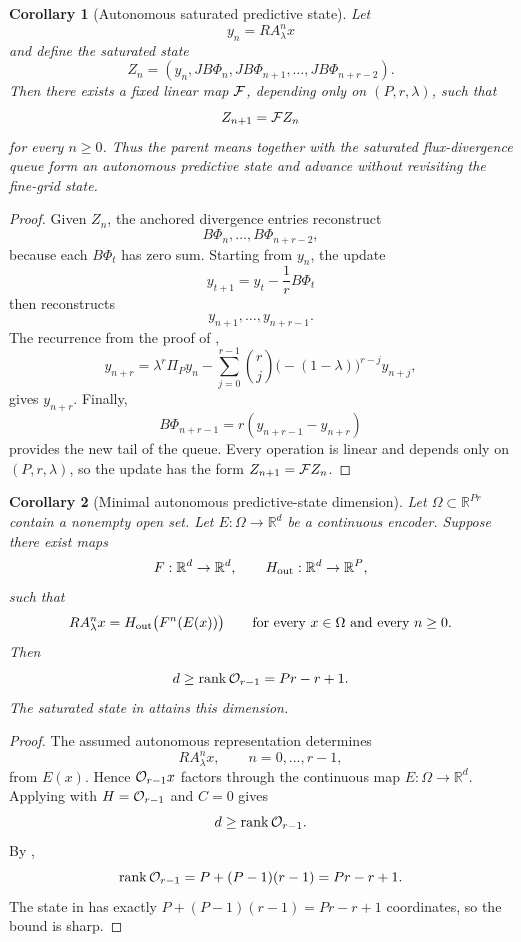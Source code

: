 \documentclass[preprint,12pt]{elsarticle}
\theoremstyle{plain}
\newtheorem{corollary}{Corollary}
\theoremstyle{remark}
\theoremstyle{definition}
\DeclareMathOperator{\rank}{rank}
\begin{document}
\begin{corollary}[Autonomous saturated predictive state]
\label{cor:autonomous-state}
Let
\[
  y_n=RA_\lambda^n x
\]
and define the saturated state
\[
  Z_n
  =
  \left(
  y_n,
  JB\Phi_n,
  JB\Phi_{n+1},
  \ldots,
  JB\Phi_{n+r-2}
  \right).
\]
Then there exists a fixed linear map \({\cal F}\), depending only on
\((P,r,\lambda)\), such that
\[
  Z_{n+1}={\cal F}Z_n
\]
for every \(n\ge0\).  Thus the parent means together with the saturated
flux-divergence queue form an autonomous predictive state and advance without
revisiting the fine-grid state.
\end{corollary}

\begin{proof}
Given \(Z_n\), the anchored divergence entries reconstruct
\[
  B\Phi_n,\ldots,B\Phi_{n+r-2},
\]
because each \(B\Phi_t\) has zero sum.  Starting from \(y_n\), the update
\[
  y_{t+1}
  =
  y_t-\frac1r B\Phi_t
\]
then reconstructs
\[
  y_{n+1},\ldots,y_{n+r-1}.
\]
The recurrence from the proof of ,
\[
  y_{n+r}
  =
  \lambda^r \Pi_P y_n
  -
  \sum_{j=0}^{r-1}
  \binom{r}{j}
  \bigl(-(1-\lambda)\bigr)^{r-j}
  y_{n+j},
\]
gives \(y_{n+r}\).  Finally,
\[
  B\Phi_{n+r-1}
  =
  r(y_{n+r-1}-y_{n+r})
\]
provides the new tail of the queue.  Every operation is linear and depends
only on \((P,r,\lambda)\), so the update has the form
\(Z_{n+1}={\cal F}Z_n\).
\end{proof}

\begin{corollary}[Minimal autonomous predictive-state dimension]
\label{cor:minimal-autonomous-dimension}
Let \(\Omega\subset\mathbb R^{Pr}\) contain a nonempty open set.  Let
\(E:\Omega\to\mathbb R^d\) be a continuous encoder.  Suppose there exist maps
\[
  F:\mathbb R^d\to\mathbb R^d,
  \qquad
  H_{\rm out}:\mathbb R^d\to\mathbb R^P,
\]
such that
\[
  RA_\lambda^n x
  =
  H_{\rm out}\bigl(F^n(E(x))\bigr)
  \qquad
  \text{for every }x\in\Omega\text{ and every }n\ge0.
\]
Then
\[
  d\ge \rank{\cal O}_{r-1}
  =
  Pr-r+1.
\]
The saturated state in  attains this dimension.
\end{corollary}

\begin{proof}
The assumed autonomous representation determines
\[
  RA_\lambda^n x,
  \qquad
  n=0,\ldots,r-1,
\]
from \(E(x)\).  Hence \({\cal O}_{r-1}x\) factors through the continuous map
\(E:\Omega\to\mathbb R^d\).  Applying  with
\(H={\cal O}_{r-1}\) and \(C=0\) gives
\[
  d\ge \rank{\cal O}_{r-1}.
\]
By ,
\[
  \rank{\cal O}_{r-1}
  =
  P+(P-1)(r-1)
  =
  Pr-r+1.
\]
The state in  has exactly
\(P+(P-1)(r-1)=Pr-r+1\) coordinates, so the bound is sharp.
\end{proof}
\end{document}
